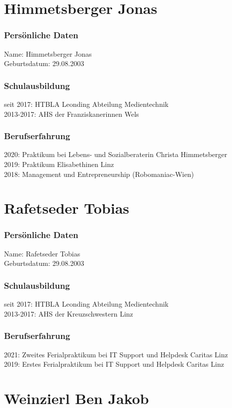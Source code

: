 
\section{Himmetsberger Jonas}
\subsubsection{Persönliche Daten}
Name: Himmetsberger Jonas \\
Geburtsdatum: 29.08.2003
\subsubsection{Schulausbildung}
seit 2017: HTBLA Leonding Abteilung Medientechnik \\
2013-2017: AHS der Franziskanerinnen Wels
\subsubsection{Berufserfahrung}
2020: Praktikum bei Lebens- und Sozialberaterin Christa Himmetsberger \\
2019: Praktikum Elisabethinen Linz \\
2018: Management und Entrepreneurship (Robomaniac-Wien)
\section{Rafetseder Tobias}
\subsubsection{Persönliche Daten}
Name: Rafetseder Tobias \\
Geburtsdatum: 29.08.2003
\subsubsection{Schulausbildung}
seit 2017: HTBLA Leonding Abteilung Medientechnik \\
2013-2017: AHS der Kreuzschwestern Linz
\subsubsection{Berufserfahrung}
2021: Zweites Ferialpraktikum bei IT Support und Helpdesk Caritas Linz \\
2019: Erstes Ferialpraktikum bei IT Support und Helpdesk Caritas Linz
\section{Weinzierl Ben Jakob}
